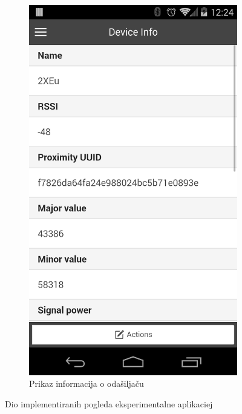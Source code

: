 \begin{figure}[H]
\begin{subfigure}[b]{0.45\textwidth}
        \includegraphics[scale=0.15]{pictures/experimental2}
        \caption{Prikaz informacija o odašiljaču}
        \label{fig:exp2}
    \end{subfigure}
    
    \caption{Dio implementiranih pogleda eksperimentalne aplikaciej}
\end{figure}

